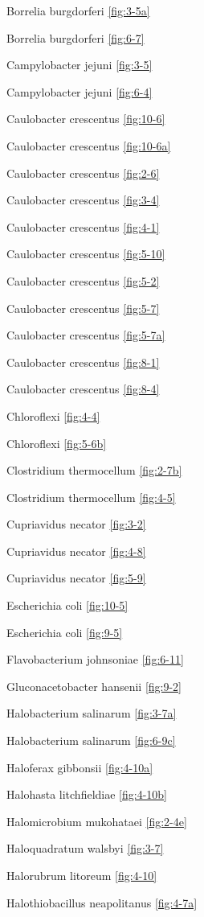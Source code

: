 \documentclass[]{tufte-book}
\begin{document}
Borrelia burgdorferi \ref{fig:3-5a}

Borrelia burgdorferi \ref{fig:6-7}

Campylobacter jejuni \ref{fig:3-5}

Campylobacter jejuni \ref{fig:6-4}

Caulobacter crescentus \ref{fig:10-6}

Caulobacter crescentus \ref{fig:10-6a}

Caulobacter crescentus \ref{fig:2-6}

Caulobacter crescentus \ref{fig:3-4}

Caulobacter crescentus \ref{fig:4-1}

Caulobacter crescentus \ref{fig:5-10}

Caulobacter crescentus \ref{fig:5-2}

Caulobacter crescentus \ref{fig:5-7}

Caulobacter crescentus \ref{fig:5-7a}

Caulobacter crescentus \ref{fig:8-1}

Caulobacter crescentus \ref{fig:8-4}

Chloroflexi \ref{fig:4-4}

Chloroflexi \ref{fig:5-6b}

Clostridium thermocellum \ref{fig:2-7b}

Clostridium thermocellum \ref{fig:4-5}

Cupriavidus necator \ref{fig:3-2}

Cupriavidus necator \ref{fig:4-8}

Cupriavidus necator \ref{fig:5-9}

Escherichia coli \ref{fig:10-5}

Escherichia coli \ref{fig:9-5}

Flavobacterium johnsoniae \ref{fig:6-11}

Gluconacetobacter hansenii \ref{fig:9-2}

Halobacterium salinarum \ref{fig:3-7a}

Halobacterium salinarum \ref{fig:6-9c}

Haloferax gibbonsii \ref{fig:4-10a}

Halohasta litchfieldiae \ref{fig:4-10b}

Halomicrobium mukohataei \ref{fig:2-4e}

Haloquadratum walsbyi \ref{fig:3-7}

Halorubrum litoreum \ref{fig:4-10}

Halothiobacillus neapolitanus \ref{fig:4-7a}
\end{document}

